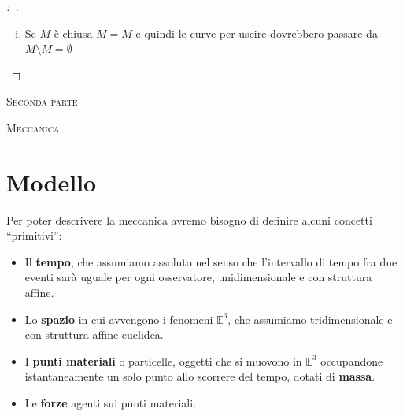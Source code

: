 \documentclass[11pt,a4paper,twoside]{book}
\newenvironment{dimo}[1][\proofname]{
	\begin{tcolorbox}[
	breakable, 
	enhanced, 
	interior hidden, 
	frame hidden, 
	borderline west = {1pt}{0pt}{gray}, 
	top=0pt, bottom=0pt, left=0pt]
\begin{proof}[#1:~]
}
{
\end{proof}
\end{tcolorbox}
}
\theoremstyle{esss}
\theoremstyle{dotless}
\numberwithin{equation}{section} %
\begin{document}
\begin{dimo}
\begin{enumerate}[i.]
Sia per assurdo $\overline{z}\in M$. Allora $\exists b>0$ tale che $t\mapsto\Phi_{t}^X(\overline{z})\in M \quad \forall t\in(-b,b)$ per quanto visto sopra.
Però 
\[\Phi_t^X(\overline{z})=\Phi_t^X \left( \Phi_{\overline{t}}^X(z_0) \right)=\Phi_{t+\overline{t}}^X(z_0)=z_{t+\overline{t}} \]
che implicherebbe che $z_t\in M \quad \forall t\in (\overline{t},\overline{t}+b)$ che è assurdo dato che la $t\mapsto z_t$ dovrebbe uscire da $M$ a $\overline{t}$.

Quindi i punti di uscita delle soluzioni sono in $\overline{M}\setminus M$.
\item Se $M$ è chiusa $\overline{M}=M$ e quindi le curve per uscire dovrebbero passare da $M\setminus M=\emptyset$ \qedhere
\end{enumerate}
\end{dimo}



\cleardoublepage
{}
\thispagestyle{plain}
	\begin{center}
		\vspace{.1\textheight}
		{\LARGE\scshape \textsc{Seconda parte}\par}
		\vspace{.1\textheight}
		\textsc{}\par
		\vspace{.05\textheight}
		{\Huge \textsc{Meccanica}\par}
		\vfill

\end{center}



\section{Modello}


\newcommand{\proSc}{\odot}
\newcommand{\proVe}{\otimes}

Per poter descrivere la meccanica avremo bisogno di definire alcuni concetti ``primitivi'': \begin{itemize}
\item Il \textbf{tempo}, che assumiamo assoluto nel senso che l'intervallo di tempo fra due eventi sarà uguale per ogni osservatore, unidimensionale e con struttura affine.
\item Lo \textbf{spazio} in cui avvengono i fenomeni $\mathbb{E}^3$, che assumiamo tridimensionale e con struttura affine euclidea.
\item I \textbf{punti materiali} o particelle, oggetti che si muovono in $\mathbb{E}^3$ occupandone istantaneamente un solo punto allo scorrere del tempo, dotati di \textbf{massa}.
\item Le \textbf{forze} agenti sui punti materiali.
\end{itemize}
\end{document}
